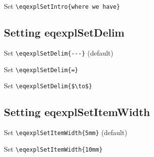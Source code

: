 \documentclass{article}
\begin{document}
\vspace{5mm}

\noindent Set \verb+\eqexplSetIntro{where we have}+

\begin{eqexpl}
  \testList
\end{eqexpl}

\eqexplSetIntro{}

\subsection{Setting eqexplSetDelim}

\noindent Set \verb+\eqexplSetDelim{---}+ (default)

\eqexplSetDelim{---}
\begin{eqexpl}
  \testList
\end{eqexpl}

\vspace{5mm}

\noindent Set \verb+\eqexplSetDelim{=}+

\eqexplSetDelim{=}
\begin{eqexpl}
  \testList
\end{eqexpl}

\vspace{5mm}

\noindent Set \verb+\eqexplSetDelim{$\to$}+

\eqexplSetDelim{$\to$}
\begin{eqexpl}
  \testList
\end{eqexpl}

\eqexplSetDelim{---}

\subsection{Setting eqexplSetItemWidth}

\noindent Set \verb+\eqexplSetItemWidth{5mm}+ (default)

\eqexplSetItemWidth{5mm}
\begin{eqexpl}
  \testList
\end{eqexpl}

\vspace{5mm}

\noindent Set \verb+\eqexplSetItemWidth{10mm}+

\eqexplSetItemWidth{10mm}
\begin{eqexpl}
  \testList
\end{eqexpl}
\end{document}
